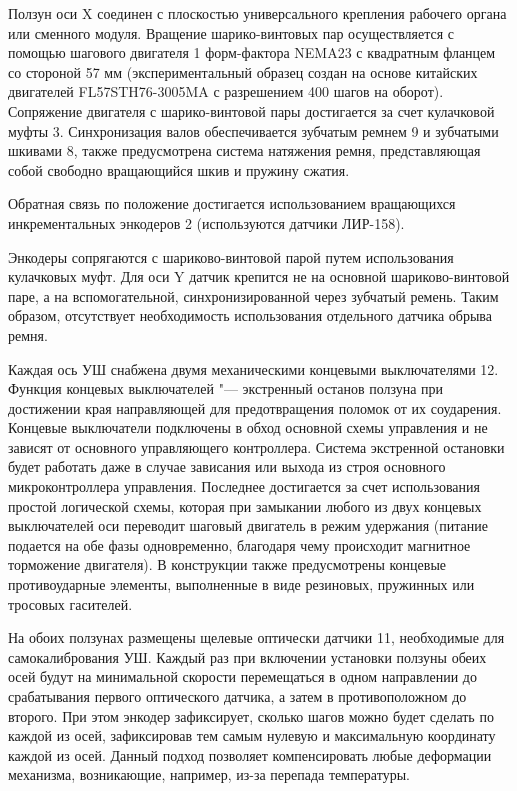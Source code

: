 Ползун оси X соединен с плоскостью универсального крепления рабочего органа или сменного модуля.
Вращение шарико-винтовых пар осуществляется с помощью шагового двигателя 1 форм-фактора NEMA23 с квадратным фланцем со стороной 57 мм (экспериментальный образец создан на основе китайских двигателей FL57STH76-3005MA с разрешением 400 шагов на оборот). Сопряжение двигателя с шарико-винтовой пары достигается за счет кулачковой муфты 3. Синхронизация валов обеспечивается зубчатым ремнем 9 и зубчатыми шкивами 8, также предусмотрена система натяжения ремня, представляющая собой свободно вращающийся шкив и пружину сжатия.

Обратная связь по положение достигается использованием вращающихся инкрементальных энкодеров 2 (используются датчики ЛИР-158).

Энкодеры сопрягаются с шариково-винтовой парой путем использования кулачковых муфт. Для оси Y датчик крепится не на основной шариково-винтовой паре, а на вспомогательной, синхронизированной через зубчатый ремень. Таким образом, отсутствует необходимость использования отдельного датчика обрыва ремня. 

Каждая ось УШ снабжена двумя механическими концевыми выключателями 12. Функция концевых выключателей "--- экстренный останов ползуна при достижении края направляющей для предотвращения поломок от их соударения. Концевые выключатели подключены в обход основной схемы управления и не зависят от основного управляющего контроллера. Система экстренной остановки будет работать даже в случае зависания или выхода из строя основного микроконтроллера управления. Последнее достигается за счет использования простой логической схемы, которая при замыкании любого из двух концевых выключателей оси переводит шаговый двигатель в режим удержания (питание подается на обе фазы одновременно, благодаря чему происходит магнитное торможение двигателя). В конструкции также предусмотрены концевые противоударные элементы, выполненные в виде резиновых, пружинных или тросовых гасителей.

На обоих ползунах размещены щелевые оптически датчики 11, необходимые для самокалибрования УШ. Каждый раз при включении установки ползуны обеих осей будут на минимальной скорости перемещаться в одном направлении до срабатывания первого оптического датчика, а затем в противоположном до второго. При этом энкодер зафиксирует, сколько шагов можно будет сделать по каждой из осей, зафиксировав тем самым нулевую и максимальную координату каждой из осей. Данный подход позволяет компенсировать любые деформации механизма, возникающие, например, из-за перепада температуры.

